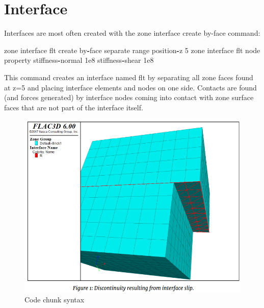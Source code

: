\documentclass[a4paper, nobind]{templates/ociamthesis}
\newenvironment{Shaded}{\begin{snugshade}}{\end{snugshade}}
\newcommand{\BuiltInTok}[1]{#1}
\newcommand{\DecValTok}[1]{\textcolor[rgb]{0.00,0.00,0.81}{#1}}
\newcommand{\FloatTok}[1]{\textcolor[rgb]{0.00,0.00,0.81}{#1}}
\newcommand{\NormalTok}[1]{#1}
\newcommand{\OperatorTok}[1]{\textcolor[rgb]{0.81,0.36,0.00}{\textbf{#1}}}
\newcommand{\StringTok}[1]{\textcolor[rgb]{0.31,0.60,0.02}{#1}}
\renewenvironment{Shaded}
{
  \vspace{10pt}%
  \begin{snugshade}%
}{%
  \end{snugshade}%
  \vspace{8pt}%
}
\begin{document}
\hypertarget{interface}{%
\section{Interface}\label{interface}}

Interfaces are most often created with the zone interface create by-face
command:

\begin{Shaded}
\begin{Highlighting}[]
\NormalTok{zone interface }\StringTok{\textquotesingle{}flt\textquotesingle{}}\NormalTok{ create by}\OperatorTok{{-}}\NormalTok{face separate }\BuiltInTok{range}\NormalTok{ position}\OperatorTok{{-}}\NormalTok{z }\DecValTok{5}
\NormalTok{zone interface }\StringTok{\textquotesingle{}flt\textquotesingle{}}\NormalTok{ node }\BuiltInTok{property}\NormalTok{ stiffness}\OperatorTok{{-}}\NormalTok{normal }\FloatTok{1e8}\NormalTok{ stiffness}\OperatorTok{{-}}\NormalTok{shear }\FloatTok{1e8}
\end{Highlighting}
\end{Shaded}

This command creates an interface named flt by separating all zone faces
found at z=5 and placing interface elements and nodes on one side.
Contacts are found (and forces generated) by interface nodes coming into
contact with zone surface faces that are not part of the interface
itself.

\begin{figure}[H]
\includegraphics[width=1\linewidth]{myfigureeeeee/k} \caption{Code chunk syntax}\label{fig:unnamed-chunk-70}
\end{figure}
\end{document}
